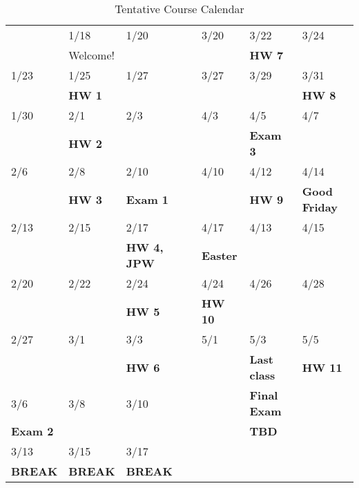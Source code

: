 \documentclass[11pt]{article}
\begin{document}
\begin{table}[htbp]
\caption{Tentative Course Calendar}
\centering
\begin{tabular}{lllllll}
\hline
 & 1/18 & 1/20 & \quad\quad\quad\quad & 3/20 & 3/22 & 3/24\\
 & Welcome! &  &  &  & \textbf{HW 7} & \\
\hline
1/23 & 1/25 & 1/27 &  & 3/27 & 3/29 & 3/31\\
 & \textbf{HW 1} &  &  &  &  & \textbf{HW 8}\\
\hline
1/30 & 2/1 & 2/3 &  & 4/3 & 4/5 & 4/7\\
 & \textbf{HW 2} &  &  &  & \textbf{Exam 3} & \\
\hline
2/6 & 2/8 & 2/10 &  & 4/10 & 4/12 & 4/14\\
 & \textbf{HW 3} & \textbf{Exam 1} &  &  & \textbf{HW 9} & \textbf{Good Friday}\\
\hline
2/13 & 2/15 & 2/17 &  & 4/17 & 4/13 & 4/15\\
 &  & \textbf{HW 4, JPW} &  & \textbf{Easter} &  & \\
\hline
2/20 & 2/22 & 2/24 &  & 4/24 & 4/26 & 4/28\\
 &  & \textbf{HW 5} &  & \textbf{HW 10} &  & \\
\hline
2/27 & 3/1 & 3/3 &  & 5/1 & 5/3 & 5/5\\
 &  & \textbf{HW 6} &  &  & \textbf{Last class} & \textbf{HW 11}\\
\hline
3/6 & 3/8 & 3/10 &  &  & \textbf{Final Exam} & \\
\textbf{Exam 2} &  &  &  &  & \textbf{TBD} & \\
\hline
3/13 & 3/15 & 3/17 &  &  &  & \\
\textbf{BREAK} & \textbf{BREAK} & \textbf{BREAK} &  &  &  & \\
\hline
\end{tabular}
\end{table}
\end{document}
